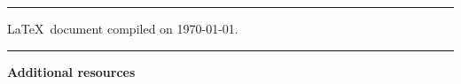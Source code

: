 \mbox{}
\vfill

{\small\onehalfspacing
\begin{center}

\noindent\rule{\textwidth}{1pt} %

    \LaTeX~document compiled on \today.

\noindent\rule{\textwidth}{.2pt} %

    \textbf{Additional resources}
    


\end{center}
} %